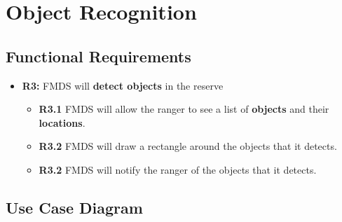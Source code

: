 \section{ Object Recognition }
\subsection{Functional Requirements}
	\begin{flushleft}
		\begin{itemize}
			\item{\textbf{R3:}} FMDS will \textbf{detect objects} in the reserve
				\begin{itemize}
					\item{\textbf{R3.1}} FMDS will allow the ranger to see a list of \textbf{objects} and their \textbf{locations}.
					\item{\textbf{R3.2}} FMDS will draw a rectangle around the objects that it detects.
					\item{\textbf{R3.2}} FMDS will notify the ranger of the objects that it detects.
				\end{itemize}
		\end{itemize}
	\end{flushleft}

\subsection{Use Case Diagram}


